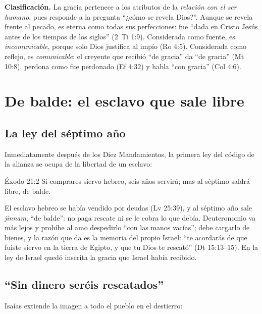 \textbf{Clasificación.} La gracia pertenece a los atributos de la \emph{relación con el ser humano}, pues responde a la pregunta ``¿cómo se revela Dios?''. Aunque se revela frente al pecado, es eterna como todas sus perfecciones: fue ``dada en Cristo Jesús antes de los tiempos de los siglos'' (2~Ti 1:9). Considerada como fuente, es \emph{incomunicable}, porque solo Dios justifica al impío (Ro 4:5). Considerada como reflejo, es \emph{comunicable}: el creyente que recibió ``de gracia'' da ``de gracia'' (Mt 10:8), perdona como fue perdonado (Ef 4:32) y habla ``con gracia'' (Col 4:6).


\section{De balde: el esclavo que sale libre}\label{sec:debalde-gracia}

\subsection{La ley del séptimo año}
Inmediatamente después de los Diez Mandamientos, la primera ley del código de la alianza se ocupa de la libertad de un esclavo:

\begin{verso}{Éxodo 21:2}
Si comprares siervo hebreo, seis años servirá; mas al séptimo saldrá libre, de balde.
\end{verso}

El esclavo hebreo se había vendido por deudas (Lv 25:39), y al séptimo año sale \emph{jinnam}, ``de balde'': no paga rescate ni se le cobra lo que debía. Deuteronomio va más lejos y prohíbe al amo despedirlo ``con las manos vacías''; debe cargarlo de bienes, y la razón que da es la memoria del propio Israel: ``te acordarás de que fuiste siervo en la tierra de Egipto, y que \SENOR{} tu Dios te rescató'' (Dt 15:13--15). En la ley de Israel quedó inscrita la gracia que Israel había recibido.

\subsection{“Sin dinero seréis rescatados”}
Isaías extiende la imagen a todo el pueblo en el destierro:

